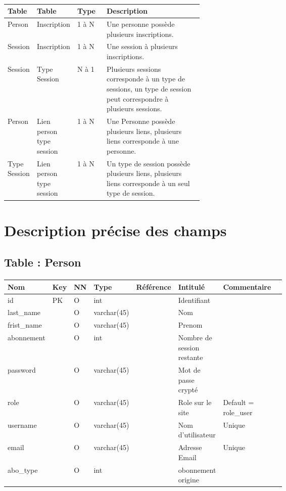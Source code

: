 	\paragraph{}
		\begin{tabularx}{\linewidth}{|T{0.15\linewidth}|T{0.15\linewidth}|T{0.15\linewidth}|Y|}
			\hline
			Table & Table & Type & Description\\
			\hline	
			Person & Inscription & 1 à N & Une personne possède plusieurs inscriptions. \\
			\hline
			Session & Inscription & 1 à N & Une session à plusieurs inscriptions. \\
			\hline
			Session & Type Session & N à 1 & Plusieurs sessions corresponde à un type de sessions, un type de session peut correspondre à plusieurs sessions. \\
			\hline
			Person & Lien person type session & 1 à N & Une Personne possède plusieurs liens, plusieurs liens corresponde à une personne. \\
			\hline
			Type Session & Lien person type session & 1 à N & Un type de session possède plusieurs liens, plusieurs liens corresponde à un seul type de session. \\
			\hline
		\end{tabularx}
		
\vspace{\baselineskip}
\section{Description précise des champs}
	\subsection{Table : Person}
		\paragraph{}
			\begin{tabularx}{\linewidth}{|T{0.14\linewidth}|T{0.05\linewidth}|T{0.05\linewidth}|T{0.13\linewidth}|T{0.14\linewidth}|T{0.13\linewidth}|Y|}
				\hline
				Nom & Key & NN & Type & Référence & Intitulé & Commentaire \\
				\hline
				id & PK & O & int & & Identifiant & \\
				\hline
				last\_name & & O & varchar(45) & & Nom & \\
				\hline
				frist\_name & & O & varchar(45) & & Prenom & \\
				\hline
				abonnement & & O & int & & Nombre de session restante & \\
				\hline
				password & & O & varchar(45) & & Mot de passe crypté & \\
				\hline
				role & & O & varchar(45) & & Role sur le site & Default = role\_user \\
				\hline
				username & & O & varchar(45) & & Nom d'utilisateur & Unique \\
				\hline
				email & & O & varchar(45) & & Adresse Email & Unique \\
				\hline
				abo\_type & & O & int & & obonnement origine & \\
				\hline
			\end{tabularx}
	
